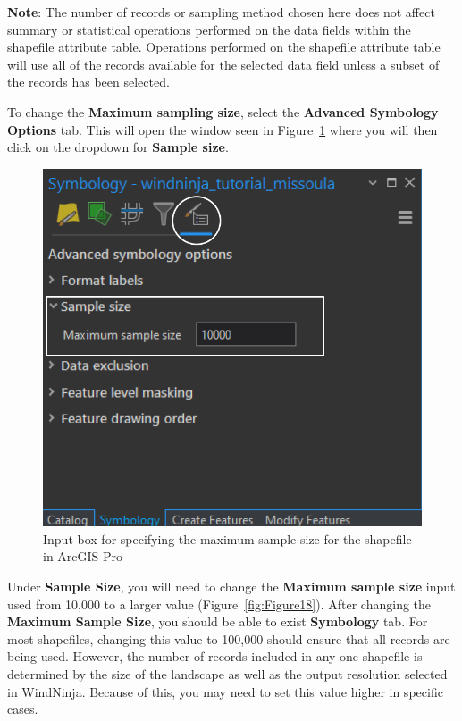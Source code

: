 \documentclass[12pt]{article}
\begin{document}
\textbf{Note}: The number of records or sampling method chosen here does not affect summary or statistical operations performed on the data fields within the shapefile attribute table. Operations performed on the shapefile attribute table will use all of the records available for the selected data field unless a subset of the records has been selected. 

To change the \textbf{Maximum sampling size}, select the \textbf{Advanced Symbology Options} tab. This will open the window seen in Figure~\ref{fig:Figure19} where you will then click on the dropdown for \textbf{Sample size}. 

\begin{figure}[H]
	\centering
	\includegraphics[scale=0.45]{arc_19.png}
	\caption{Input box for specifying the maximum sample size for the shapefile in ArcGIS Pro}
\label{fig:Figure19}
\end{figure}

Under \textbf{Sample Size}, you will need to change the \textbf{Maximum sample size} input used from 10,000 to a larger value (Figure~\ref{fig:Figure18}). After changing the \textbf{Maximum Sample Size}, you should be able to exist \textbf{Symbology} tab. For most shapefiles, changing this value to 100,000 should ensure that all records are being used. However, the number of records included in any one shapefile is determined by the size of the landscape as well as the output resolution selected in WindNinja. Because of this, you may need to set this value higher in specific cases.
\end{document}
